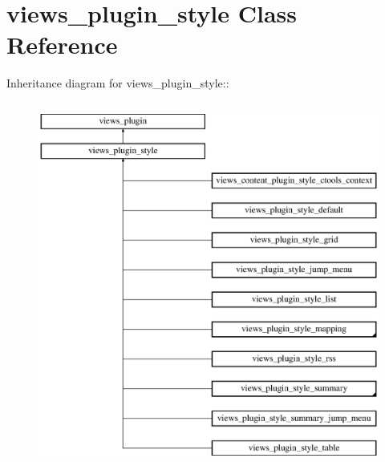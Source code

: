\hypertarget{classviews__plugin__style}{
\section{views\_\-plugin\_\-style Class Reference}
\label{classviews__plugin__style}
}
Inheritance diagram for views\_\-plugin\_\-style::\begin{figure}[H]
\begin{center}
\leavevmode
\includegraphics[height=12cm]{classviews__plugin__style}
\end{center}
\end{figure}
